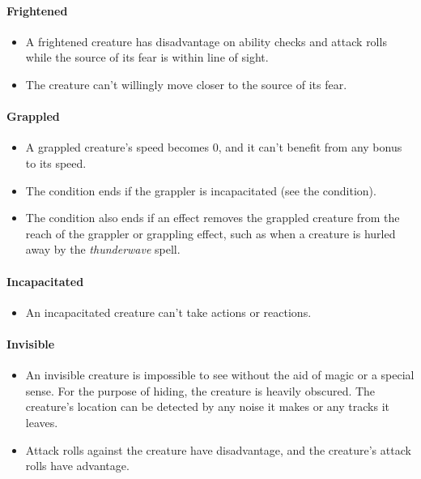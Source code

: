 \documentclass[
]{article}
\providecommand{\tightlist}{%
  \setlength{\itemsep}{0pt}\setlength{\parskip}{0pt}}
\begin{document}
\hypertarget{frightened}{%
\paragraph{Frightened}\label{frightened}}

\begin{itemize}
\tightlist
\item
  A frightened creature has disadvantage on ability checks and attack
  rolls while the source of its fear is within line of sight.
\item
  The creature can't willingly move closer to the source of its fear.
\end{itemize}

\hypertarget{grappled}{%
\paragraph{Grappled}\label{grappled}}

\begin{itemize}
\tightlist
\item
  A grappled creature's speed becomes 0, and it can't benefit from any
  bonus to its speed.
\item
  The condition ends if the grappler is incapacitated (see the
  condition).
\item
  The condition also ends if an effect removes the grappled creature
  from the reach of the grappler or grappling effect, such as when a
  creature is hurled away by the \emph{thunderwave} spell.
\end{itemize}

\hypertarget{incapacitated}{%
\paragraph{Incapacitated}\label{incapacitated}}

\begin{itemize}
\tightlist
\item
  An incapacitated creature can't take actions or reactions.
\end{itemize}

\hypertarget{invisible}{%
\paragraph{Invisible}\label{invisible}}

\begin{itemize}
\item
  An invisible creature is impossible to see without the aid of magic or
  a special sense. For the purpose of hiding, the creature is heavily
  obscured. The creature's location can be detected by any noise it
  makes or any tracks it leaves.
\item
  Attack rolls against the creature have disadvantage, and the
  creature's attack rolls have advantage.
\end{itemize}
\end{document}
